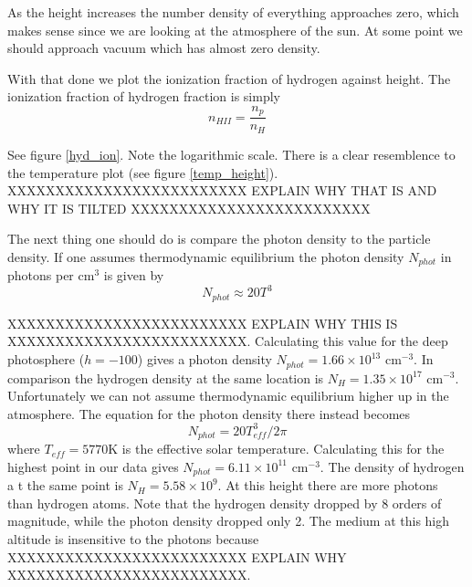 \documentclass{aa}   %
\begin{document}
As the height increases the number density of everything approaches zero, which makes sense since we are looking at the atmosphere of the sun. At some point we should approach vacuum which has almost zero density.

With that done we plot the ionization fraction of hydrogen against height. 
The ionization fraction of hydrogen fraction is simply
\begin{equation}
 n_{HII} = \frac{n_p}{n_H}
\end{equation}

See figure \ref{hyd_ion}. Note the logarithmic scale.
There is a clear resemblence to the temperature plot (see figure \ref{temp_height}).
XXXXXXXXXXXXXXXXXXXXXXXXX EXPLAIN WHY THAT IS AND WHY IT IS TILTED XXXXXXXXXXXXXXXXXXXXXXXXX



The next thing one should do is compare the photon density to the particle density.
If one assumes thermodynamic equilibrium the photon density $N_{phot}$ in photons per cm$^3$ is given by
\begin{equation}
 N_{phot} \approx 20T^3
\end{equation}

XXXXXXXXXXXXXXXXXXXXXXXXX EXPLAIN WHY THIS IS XXXXXXXXXXXXXXXXXXXXXXXXX.
Calculating this value for the deep photosphere ($h = -100$) gives a photon density $N_{phot} = 1.66\times10^{13}$ cm$^{-3}$. In comparison the hydrogen density at the same location is $N_H = 1.35\times10^{17}$ cm$^{-3}$. 
Unfortunately we can not assume thermodynamic equilibrium higher up in the atmosphere. The equation for the photon density there instead becomes
\begin{equation}
 N_{phot} = 20T_{eff}^3/2\pi
\end{equation}
where $T_{eff} = 5770$K is the effective solar temperature.
Calculating this for the highest point in our data gives $N_{phot} = 6.11\times 10^{11}$ cm$^{-3}$. The density of hydrogen a
t the same point is $N_H = 5.58\times 10^9$. At this height there are more photons than hydrogen atoms. Note that the hydrogen density dropped by 8 orders of magnitude, while the photon density dropped only 2.
The medium at this high altitude is insensitive to the photons because XXXXXXXXXXXXXXXXXXXXXXXXX EXPLAIN WHY XXXXXXXXXXXXXXXXXXXXXXXXX.
\end{document}
